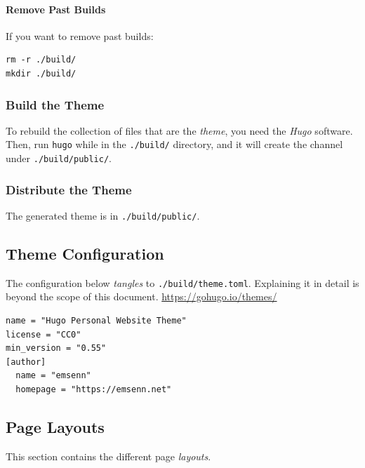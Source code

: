 \documentclass[11pt]{article}
\begin{document}
\paragraph*{Remove Past Builds}
\label{sec:org6dcf82b}
If you want to remove past builds:

\begin{verbatim}
rm -r ./build/
mkdir ./build/
\end{verbatim}
\stopcontents[level-3]
\subsubsection*{Build the Theme}
\label{sec:orgac0b865}
To rebuild the collection of files that are the \emph{theme}, you need the
\emph{Hugo} software. Then, run \texttt{hugo} while in the \texttt{./build/} directory,
and it will create the channel under \texttt{./build/public/}.
\subsubsection*{Distribute the Theme}
\label{sec:org51e9cd6}
The generated theme is in \texttt{./build/public/}.
\stopcontents[level-2]
\subsection*{Theme Configuration}
\label{sec:org3a8c6e8}
The configuration below \emph{tangles} to \texttt{./build/theme.toml}. Explaining
it in detail is beyond the scope of this document. \url{https://gohugo.io/themes/}
\begin{verbatim}
name = "Hugo Personal Website Theme"
license = "CC0"
min_version = "0.55"
[author]
  name = "emsenn"
  homepage = "https://emsenn.net"
\end{verbatim}
\subsection*{Page Layouts}
\label{sec:org5855087}
This section contains the different page \emph{layouts}.
\startcontents[level-2]
\end{document}
